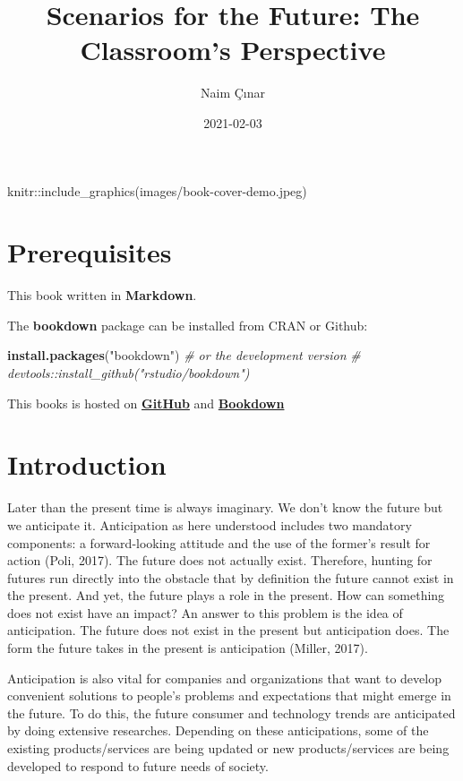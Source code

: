 \documentclass[]{book}
\title{Scenarios for the Future: The Classroom's Perspective}
\author{Naim Çınar}
\date{2021-02-03}
\newenvironment{Shaded}{\begin{snugshade}}{\end{snugshade}}
\newcommand{\CommentTok}[1]{\textcolor[rgb]{0.56,0.35,0.01}{\textit{#1}}}
\newcommand{\KeywordTok}[1]{\textcolor[rgb]{0.13,0.29,0.53}{\textbf{#1}}}
\newcommand{\NormalTok}[1]{#1}
\newcommand{\StringTok}[1]{\textcolor[rgb]{0.31,0.60,0.02}{#1}}
\begin{document}
\maketitle

{
\setcounter{tocdepth}{1}
\tableofcontents
}
knitr::include\_graphics(images/book-cover-demo.jpeg)

\hypertarget{prerequisites}{%
\chapter{Prerequisites}\label{prerequisites}}

This book written in \textbf{Markdown}.

The \textbf{bookdown} package can be installed from CRAN or Github:

\begin{Shaded}
\begin{Highlighting}[]
\KeywordTok{install.packages}\NormalTok{(}\StringTok{"bookdown"}\NormalTok{)}
\CommentTok{# or the development version}
\CommentTok{# devtools::install_github("rstudio/bookdown")}
\end{Highlighting}
\end{Shaded}

This books is hosted on \textbf{\href{https://github.com}{GitHub}} and \textbf{\href{https://bookdown.org}{Bookdown}}

\hypertarget{intro}{%
\chapter{Introduction}\label{intro}}

Later than the present time is always imaginary. We don't know the future but we anticipate it. Anticipation as here understood includes two mandatory components: a forward-looking attitude and the use of the former's result for action (Poli, 2017). The future does not actually exist. Therefore, hunting for futures run directly into the obstacle that by definition the future cannot exist in the present. And yet, the future plays a role in the present. How can something does not exist have an impact? An answer to this problem is the idea of anticipation. The future does not exist in the present but anticipation does. The form the future takes in the present is anticipation (Miller, 2017).

Anticipation is also vital for companies and organizations that want to develop convenient solutions to people's problems and expectations that might emerge in the future. To do this, the future consumer and technology trends are anticipated by doing extensive researches. Depending on these anticipations, some of the existing products/services are being updated or new products/services are being developed to respond to future needs of society.
\end{document}

